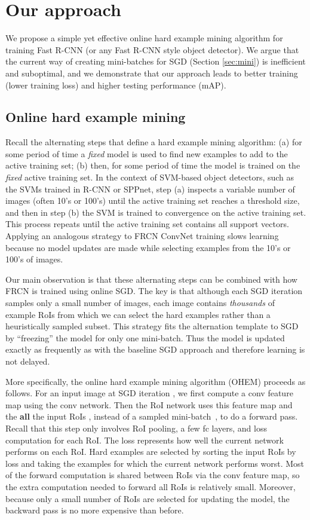 \documentclass[10pt,twocolumn,letterpaper]{article}
\begin{document}
\section{Our approach}
We propose a simple yet effective online hard example mining algorithm for training Fast R-CNN (or any Fast R-CNN style object detector). We argue that the current way of creating mini-batches for SGD (Section \ref{sec:mini}) is inefficient and suboptimal, and we demonstrate that our approach leads to better training (lower training loss) and higher testing performance (mAP).

\subsection{Online hard example mining}\label{sec:ohem}
Recall the alternating steps that define a hard example mining algorithm: (a) for some period of time a \emph{fixed} model is used to find new examples to add to the active training set; (b) then, for some period of time the model is trained on the \emph{fixed} active training set. In the context of SVM-based object detectors, such as the SVMs trained in R-CNN or SPPnet, step (a) inspects a variable number of images (often 10's or 100's) until the active training set reaches a threshold size, and then in step (b) the SVM is trained to convergence on the active training set. This process repeats until the active training set contains all support vectors. Applying an analogous strategy to FRCN ConvNet training slows learning because no model updates are made while selecting examples from the 10's or 100's of images.

Our main observation is that these alternating steps can be combined with how FRCN is trained using online SGD. The key is that although each SGD iteration samples only a small number of images, each image contains \emph{thousands} of example RoIs from which we can select the hard examples rather than a heuristically sampled subset. This strategy fits the alternation template to SGD by ``freezing'' the model for only one mini-batch. Thus the model is updated exactly as frequently as with the baseline SGD approach and therefore learning is not delayed.

More specifically, the online hard example mining algorithm (OHEM) proceeds as follows. For an input image at SGD iteration , we first compute a conv feature map using the conv network. Then the RoI network uses this feature map and the \textbf{all} the input RoIs , instead of a sampled mini-batch~\cite{frcn}, to do a forward pass. Recall that this step only involves RoI pooling, a few fc layers, and loss computation for each RoI. The loss represents how well the current network performs on each RoI. Hard examples are selected by sorting the input RoIs by loss and taking the  examples for which the current network performs worst. Most of the forward computation is shared between RoIs via the conv feature map, so the extra computation needed to forward all RoIs is relatively small. Moreover, because only a small number of RoIs are selected for updating the model, the backward pass is no more expensive than before.
\end{document}
